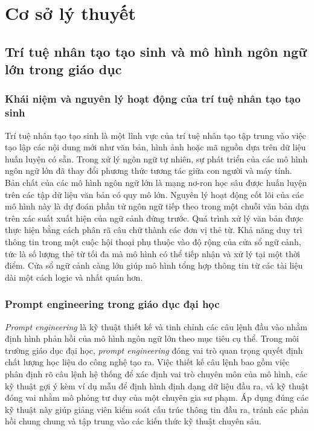 \section{Cơ sở lý thuyết}

\subsection{Trí tuệ nhân tạo tạo sinh và mô hình ngôn ngữ lớn trong giáo dục}

\subsubsection{Khái niệm và nguyên lý hoạt động của trí tuệ nhân tạo tạo sinh}
Trí tuệ nhân tạo tạo sinh là một lĩnh vực của trí tuệ nhân tạo tập trung vào việc tạo lập các nội dung mới như văn bản, hình ảnh hoặc mã nguồn dựa trên dữ liệu huấn luyện có sẵn. Trong xử lý ngôn ngữ tự nhiên, sự phát triển của các mô hình ngôn ngữ lớn đã thay đổi phương thức tương tác giữa con người và máy tính. Bản chất của các mô hình ngôn ngữ lớn là mạng nơ-ron học sâu được huấn luyện trên các tập dữ liệu văn bản có quy mô lớn. Nguyên lý hoạt động cốt lõi của các mô hình này là dự đoán phần tử ngôn ngữ tiếp theo trong một chuỗi văn bản dựa trên xác suất xuất hiện của ngữ cảnh đứng trước. Quá trình xử lý văn bản được thực hiện bằng cách phân rã câu chữ thành các đơn vị thẻ từ. Khả năng duy trì thông tin trong một cuộc hội thoại phụ thuộc vào độ rộng của cửa sổ ngữ cảnh, tức là số lượng thẻ từ tối đa mà mô hình có thể tiếp nhận và xử lý tại một thời điểm. Cửa sổ ngữ cảnh càng lớn giúp mô hình tổng hợp thông tin từ các tài liệu dài một cách logic và nhất quán hơn.

\subsubsection{Prompt engineering trong giáo dục đại học}
\textit{Prompt engineering} là kỹ thuật thiết kế và tinh chỉnh các câu lệnh đầu vào nhằm định hình phản hồi của mô hình ngôn ngữ lớn theo mục tiêu cụ thể. Trong môi trường giáo dục đại học, \textit{prompt engineering} đóng vai trò quan trọng quyết định chất lượng học liệu do công nghệ tạo ra. Việc thiết kế câu lệnh bao gồm việc phân định rõ câu lệnh hệ thống để xác định vai trò chuyên môn của mô hình, các kỹ thuật gợi ý kèm ví dụ mẫu để định hình định dạng dữ liệu đầu ra, và kỹ thuật đóng vai nhằm mô phỏng tư duy của một chuyên gia sư phạm. Áp dụng đúng các kỹ thuật này giúp giảng viên kiểm soát cấu trúc thông tin đầu ra, tránh các phản hồi chung chung và tập trung vào các kiến thức kỹ thuật chuyên sâu.

